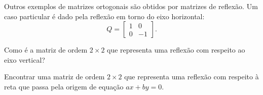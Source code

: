 \documentclass[../livro.tex]{subfiles}  %
\begin{document}
 
 
 
Outros exemplos de matrizes ortogonais são obtidos por matrizes de reflexão. Um caso particular é dado pela reflexão em torno do eixo horizontal: 
 \begin{equation}
 Q =
 \begin{bmatrix}
 1 & 0 \\
 0 & -1
 \end{bmatrix}.\end{equation}
 
 \begin{exercise}
Como é a matriz de ordem $2 \times 2$ que representa uma reflexão com respeito ao eixo vertical?
 \end{exercise}

 \begin{exercise}
Encontrar uma matriz de ordem $2 \times 2$ que representa uma reflexão com respeito à reta que passa pela origem de equação $ax + b y = 0$.
\end{exercise}
\end{document}
